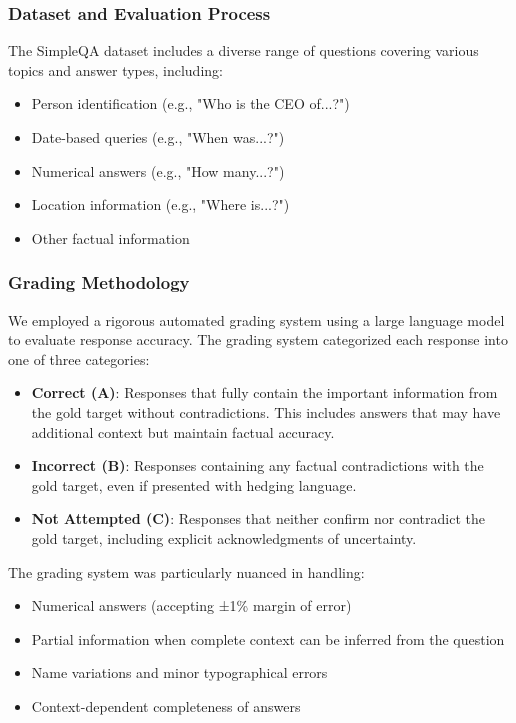 \documentclass[fleqn,moreauthors,10pt]{ds_report}
\begin{document}
\subsubsection*{Dataset and Evaluation Process}
The SimpleQA dataset includes a diverse range of questions covering various topics and answer types, including:
\begin{itemize}[noitemsep]
    \item Person identification (e.g., "Who is the CEO of...?")
    \item Date-based queries (e.g., "When was...?")
    \item Numerical answers (e.g., "How many...?")
    \item Location information (e.g., "Where is...?")
    \item Other factual information
\end{itemize}

\subsubsection*{Grading Methodology}
We employed a rigorous automated grading system using a large language model to evaluate response accuracy. The grading system categorized each response into one of three categories:

\begin{itemize}[noitemsep]
    \item \textbf{Correct (A)}: Responses that fully contain the important information from the gold target without contradictions. This includes answers that may have additional context but maintain factual accuracy.
    \item \textbf{Incorrect (B)}: Responses containing any factual contradictions with the gold target, even if presented with hedging language.
    \item \textbf{Not Attempted (C)}: Responses that neither confirm nor contradict the gold target, including explicit acknowledgments of uncertainty.
\end{itemize}

The grading system was particularly nuanced in handling:
\begin{itemize}[noitemsep]
    \item Numerical answers (accepting ±1\% margin of error)
    \item Partial information when complete context can be inferred from the question
    \item Name variations and minor typographical errors
    \item Context-dependent completeness of answers
\end{itemize}
\end{document}
